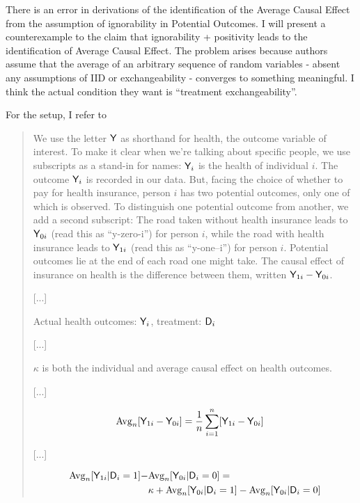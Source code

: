 There is an error in derivations of the identification of the Average Causal Effect from the assumption of ignorability in Potential Outcomes. I will present a counterexample to the claim that ignorability + positivity leads to the identification of Average Causal Effect. The problem arises because authors assume that the average of an arbitrary sequence of random variables - absent any assumptions of IID or exchangeability - converges to something meaningful. I think the actual condition they want is ``treatment exchangeability''.

For the setup, I refer to \citet{angrist_mastering_2014} 

\begin{quote}
We use the letter $\mathsf{Y}$ as shorthand for health, the outcome variable of interest. To make it clear when we’re talking about specific people, we use subscripts as a stand-in for names: $\mathsf{Y}_i$ is the health of individual $i$. The outcome $\mathsf{Y}_i$ is recorded in our data. But, facing the choice of whether to pay for health insurance, person $i$ has two potential  outcomes, only one of which is observed. To distinguish one potential outcome from another, we add a second subscript: The road taken without health insurance leads to $\mathsf{Y}_{0i}$ (read  this  as  “y-zero-i”)  for  person $i$,  while  the  road  with health insurance leads to $\mathsf{Y}_{1i}$ (read this as “y-one–i”) for person $i$. Potential outcomes lie at the end of each road one might take. The causal effect of insurance on health is the difference between them, written $\mathsf{Y}_{1i}-\mathsf{Y}_{0i}$.

[...]

Actual health outcomes: $\mathsf{Y}_i$, treatment: $\mathsf{D}_i$

[...]

$\kappa$ is both the individual and average causal effect on health outcomes.

[...]

\begin{align}
	\mathrm{Avg}_n[\mathsf{Y}_{1i}-\mathsf{Y}_{0i}] &= \frac{1}{n}\sum_{i=1}^n [\mathsf{Y}_{1i} - \mathsf{Y}_{0i}] \label{eq:cond_avg}
\end{align}

[...]

\begin{align}
	\mathrm{Avg}_n[\mathsf{Y}_{1i}|\mathsf{D}_i=1] - &\mathrm{Avg}_n[\mathsf{Y}_{0i}|\mathsf{D}_i=0] = \nonumber \\&\kappa + \mathrm{Avg}_n[\mathsf{Y}_{0i}|\mathsf{D}_i=1] - \mathrm{Avg}_n[\mathsf{Y}_{0i}|\mathsf{D}_i=0] \label{eq:angristeq14}
\end{align}


\end{quote}
